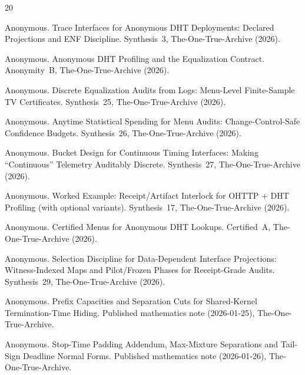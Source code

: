 \documentclass[11pt]{article}
\begin{document}

\begin{thebibliography}{20}

Anonymous.
\newblock Trace Interfaces for Anonymous DHT Deployments: Declared Projections and ENF Discipline.
\newblock Synthesis~3, The-One-True-Archive (2026).

Anonymous.
\newblock Anonymous DHT Profiling and the Equalization Contract.
\newblock Anonymity~B, The-One-True-Archive (2026).

Anonymous.
\newblock Discrete Equalization Audits from Logs: Menu-Level Finite-Sample TV Certificates.
\newblock Synthesis~25, The-One-True-Archive (2026).

Anonymous.
\newblock Anytime Statistical Spending for Menu Audits: Change-Control-Safe Confidence Budgets.
\newblock Synthesis~26, The-One-True-Archive (2026).

Anonymous.
\newblock Bucket Design for Continuous Timing Interfaces: Making ``Continuous'' Telemetry Auditably Discrete.
\newblock Synthesis~27, The-One-True-Archive (2026).


Anonymous.
\newblock Worked Example: Receipt/Artifact Interlock for OHTTP + DHT Profiling (with optional variants).
\newblock Synthesis~17, The-One-True-Archive (2026).

Anonymous.
\newblock Certified Menus for Anonymous DHT Lookups.
\newblock Certified~A, The-One-True-Archive (2026).

Anonymous.
\newblock Selection Discipline for Data-Dependent Interface Projections: Witness-Indexed Maps and Pilot/Frozen Phases for Receipt-Grade Audits.
\newblock Synthesis~29, The-One-True-Archive (2026).

Anonymous.
\newblock Prefix Capacities and Separation Cuts for Shared-Kernel Termination-Time Hiding.
\newblock Published mathematics note (2026-01-25), The-One-True-Archive.

Anonymous.
\newblock Stop-Time Padding Addendum, Max-Mixture Separations and Tail-Sign Deadline Normal Forms.
\newblock Published mathematics note (2026-01-26), The-One-True-Archive.

\end{thebibliography}
\end{document}
